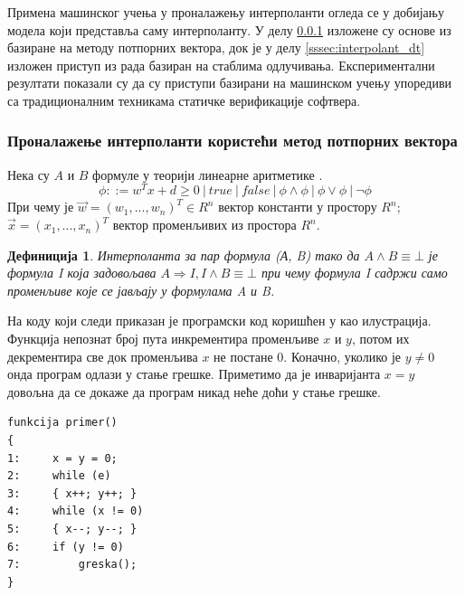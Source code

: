 \documentclass[a4paper]{article}
\newtheorem{definic}{Дефиниција}
\begin{document}
{Примена машинског учења у проналажењу интерполанти огледа се у добијању модела
који представља саму интерполанту. У делу \ref{sssec:interpolant_svm} изложене су основе из \cite{Sharma_interpolantsas} базиране на методу
потпорних вектора, док је у делу \ref{sssec:interpolant_dt} изложен приступ из рада \cite{KrishnaPW15} базиран на стаблима одлучивања. Експериментални резултати
показали су да су приступи базирани на машинском учењу упоредиви са традиционалним техникама статичке верификације софтвера.


\subsubsection{Проналажење интерполанти користећи метод потпорних вектора}
\label{sssec:interpolant_svm}

Нека су $A$ и $B$ формуле у теорији линеарне аритметике \cite{Kroening2008}.
\begin{equation}
\phi ::= w^Tx + d \geq 0 \ | \ true \ | \ false \ | \ \phi \land \phi \ | \ \phi \lor \phi \ | \ \neg \phi
\end{equation}
При чему је $\vec{w} = (w_1, ..., w_n)^T \in R^n$ вектор константи у простору $R^n$; $\vec{x} = (x_1, ..., x_n)^T$
вектор променљивих из простора $R^n$.

\begin{definic}
Интерполанта за пар формула (А, B) тако да $A \land B \equiv \bot$ је формула I која задовољава $A \Rightarrow I, I \land B \equiv \bot$
при чему формула I садржи само променљиве које се јављају у формулама A и B.
\end{definic}

На коду који следи приказан је програмски код коришћен у \cite{Sharma_interpolantsas} као илустрација.
Функција непознат број пута инкрементира променљиве $x$ и $y$, потом их декрементира све док променљива $x$
не постане 0. Коначно, уколико је $y \neq 0$ онда програм одлази у стање грешке.
Приметимо да је инваријанта $x = y$ довољна да се докаже да програм никад неће доћи у стање грешке.

\begin{verbatim}
funkcija primer()
{
1:     x = y = 0;
2:     while (e)
3:     { x++; y++; }
4:     while (x != 0)
5:     { x--; y--; }
6:     if (y != 0)
7:         greska();
}
\end{verbatim}

}
\end{document}
